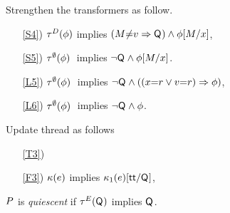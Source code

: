 Strengthen the transformers as follow.
\begin{enumerate}
\item[\ref{S4})]
  $\aTr[\bEvs]\SB0(\aForm)$ implies $(\aExp{\neq}\aVal\limplies\Q{})\land\aForm[\aExp/\aLoc]$,
\item[\ref{S5})]
  $\aTr[\emptyset]\SB0(\aForm)\;$ implies $\lnot\Q{}\land \aForm[\aExp/\aLoc]$.
\item[\ref{L5})]
  $\aTr[\emptyset]\SB0(\aForm)\;$ implies $\lnot\Q{} \land((\aLoc{=}\aReg\lor\aVal{=}\aReg)\limplies\aForm)$,
\item[\ref{L6})]
  $\aTr[\emptyset]\SB0(\aForm)\;$ implies $\lnot\Q{} \land\aForm$.
\end{enumerate}
Update thread as follows
\begin{enumerate}
\item[\ref{T3})]
\item[\ref{F3})]
  $\labelingForm\SB0(\aEv)$ implies $\labelingForm_1(\aEv)[\TRUE/\Q{}]$, 
\end{enumerate}

\begin{definition}
  $\aPS$ is \emph{quiescent} if $\aTr[\aEvs](\Q{})$ implies $\Q{}$.
\end{definition}


